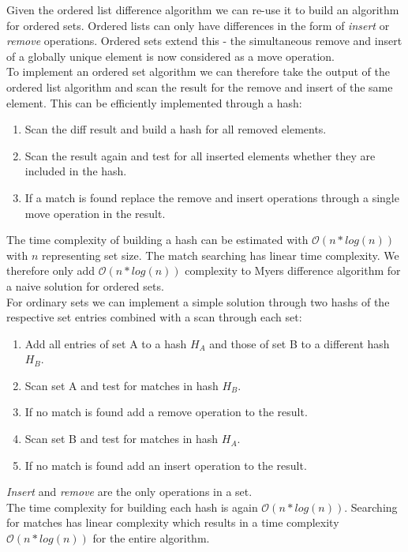 Given the ordered list difference algorithm we can re-use it to build an algorithm for ordered sets.
Ordered lists can only have differences in the form of \emph{insert} or \emph{remove} operations.
Ordered sets extend this - the simultaneous remove and insert of a globally unique element is now considered as a move operation.\\
To implement an ordered set algorithm we can therefore take the output of the ordered list algorithm and scan the result for the remove and insert of the same element.
This can be efficiently implemented through a hash:

\begin{enumerate}
\item Scan the diff result and build a hash for all removed elements.
\item Scan the result again and test for all inserted elements whether they are included in the hash.
\item If a match is found replace the remove and insert operations through a single move operation in the result.
\end{enumerate}

The time complexity of building a hash can be estimated with $ \mathcal O(n * log(n)) $ with $ n $ representing set size.
The match searching has linear time complexity.
We therefore only add $ \mathcal O(n * log(n)) $ complexity to Myers difference algorithm for a naive solution for ordered sets.\\

For ordinary sets we can implement a simple solution through two hashs of the respective set entries combined with a scan through each set:

\begin{enumerate}
\item Add all entries of set A to a hash $ H_A $ and those of set B to a different hash $ H_B $.
\item Scan set A and test for matches in hash $ H_B $.
\item If no match is found add a remove operation to the result.
\item Scan set B and test for matches in hash $ H_A $.
\item If no match is found add an insert operation to the result.
\end{enumerate}

\emph{Insert} and \emph{remove} are the only operations in a set.\\
The time complexity for building each hash is again $ \mathcal O(n * log(n)) $.
Searching for matches has linear complexity which results in a time complexity $ \mathcal O(n * log(n)) $ for the entire algorithm.\\

